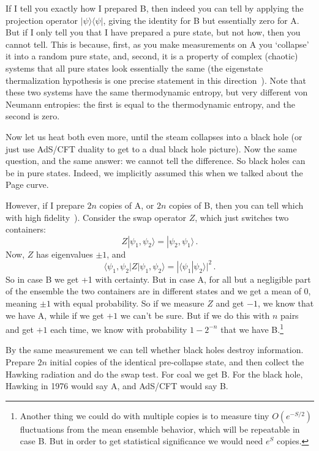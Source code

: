 \documentclass[12pt]{article}
\newcommand{\be}{\begin{equation}}
\newcommand{\ee}{\end{equation}}
\begin{document}
If I tell you exactly how I prepared B, then indeed you can tell by applying the projection operator $ | \psi \rangle\langle \psi |$, giving the identity for B but essentially zero for A.  But if I only tell you that I have prepared a pure state, but not how, then you cannot tell.  This is because, first, as you make measurements on A you `collapse' it into a random pure state, and, second, it is a property of complex (chaotic) systems that all pure states look essentially the same (the eigenstate thermalization hypothesis is one precise statement in this direction~\cite{ETH}).  Note that these two systems have the same thermodynamic entropy, but very different von Neumann entropies: the first is equal to the thermodynamic entropy, and the second is zero.

Now let us heat both even more, until the steam collapses into a black hole (or just use AdS/CFT duality to get to a dual black hole picture).  Now the same question, and the same answer: we cannot tell the difference.  So black holes can be in pure states.  Indeed, we implicitly assumed this when we talked about the Page curve.

However, if I prepare $2n$ copies of A, or $2n$ copies of B, then you can tell which with high fidelity~\cite{Hayden:2007cs,Harlow:2014yka}).  Consider the swap operator $Z$, which just switches two containers:
\be
Z |\psi_1, \psi_2 \rangle =  |\psi_2, \psi_1\rangle \,.
\ee
Now, $Z$ has eigenvalues $\pm 1$, and 
\be
\langle \psi_1, \psi_2 | Z |\psi_1, \psi_2 \rangle = |\langle \psi_1 |\psi_2 \rangle|^2  \,.
\ee
So in case B we get +1 with certainty.  But in case A, for all but a negligible part of the ensemble the two containers are in different states and we get a mean of 0, meaning $\pm 1$ with equal probability.  So if we measure $Z$ and get $-1$, we know that we have A, while if we get $+1$ we can't be sure.  But if we do this with $n$ pairs and get $+1$ each time, we know with probability $1 - 2^{-n}$ that we have B.\footnote{Another thing we could do with multiple copies is to measure tiny $O(e^{-S/2})$ fluctuations from the mean ensemble behavior, which will be repeatable in case B.  But in order to get statistical significance we would need $e^S$ copies.}

By the same measurement we can tell whether black holes destroy information.  Prepare $2n$ initial copies of the identical pre-collapse state, and then collect the Hawking radiation and do the swap test.  For coal we get B.  For the black hole, Hawking in 1976 would say A, and AdS/CFT would say B.
\end{document}

